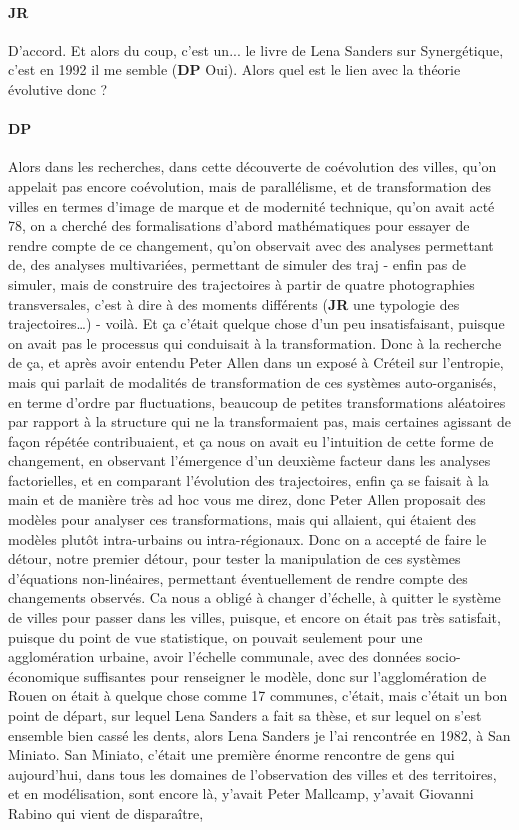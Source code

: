 \documentclass[12pt]{article}
\begin{document}
\paragraph{JR}

D'accord. Et alors du coup, c'est un... le livre de Lena Sanders sur Synergétique, c'est en 1992 il me semble (\textbf{DP} Oui). Alors quel est le lien avec la théorie évolutive donc ?


\paragraph{DP}

Alors dans les recherches, dans cette découverte de coévolution des villes, qu'on appelait pas encore coévolution, mais de parallélisme, et de transformation des villes en termes d'image de marque et de modernité technique, qu'on avait acté 78, on a cherché des formalisations d'abord mathématiques pour essayer de rendre compte de ce changement, qu'on observait avec des analyses permettant de, des analyses multivariées, permettant de simuler des traj - enfin pas de simuler, mais de construire des trajectoires à partir de quatre photographies transversales, c'est à dire à des moments différents (\textbf{JR} une typologie des trajectoires\ldots ) - voilà. Et ça c'était quelque chose d'un peu insatisfaisant, puisque on avait pas le processus qui conduisait à la transformation. Donc à la recherche de ça, et après avoir entendu Peter Allen dans un exposé à Créteil sur l'entropie, mais qui parlait de modalités de transformation de ces systèmes auto-organisés, en terme d'ordre par fluctuations, beaucoup de petites transformations aléatoires par rapport à la structure qui ne la transformaient pas, mais certaines agissant de façon répétée contribuaient, et ça nous on avait eu l'intuition de cette forme de changement, en observant l'émergence d'un deuxième facteur dans les analyses factorielles, et en comparant l'évolution des trajectoires, enfin ça se faisait à la main et de manière très ad hoc vous me direz, donc Peter Allen proposait des modèles pour analyser ces transformations, mais qui allaient, qui étaient des modèles plutôt intra-urbains ou intra-régionaux. Donc on a accepté de faire le détour, notre premier détour, pour tester la manipulation de ces systèmes d'équations non-linéaires, permettant éventuellement de rendre compte des changements observés. Ca nous a obligé à changer d'échelle, à quitter le système de villes pour passer dans les villes, puisque, et encore on était pas très satisfait, puisque du point de vue statistique, on pouvait seulement pour une agglomération urbaine, avoir l'échelle communale, avec des données socio-économique suffisantes pour renseigner le modèle, donc sur l'agglomération de Rouen on était à quelque chose comme 17 communes, c'était, mais c'était un bon point de départ, sur lequel Lena Sanders a fait sa thèse, et sur lequel on s'est ensemble bien cassé les dents, alors Lena Sanders je l'ai rencontrée en 1982, à San Miniato. San Miniato, c'était une première énorme rencontre de gens qui aujourd'hui, dans tous les domaines de l'observation des villes et des territoires, et en modélisation, sont encore là, y'avait Peter Mallcamp, y'avait Giovanni Rabino qui vient de disparaître, 
\end{document}
